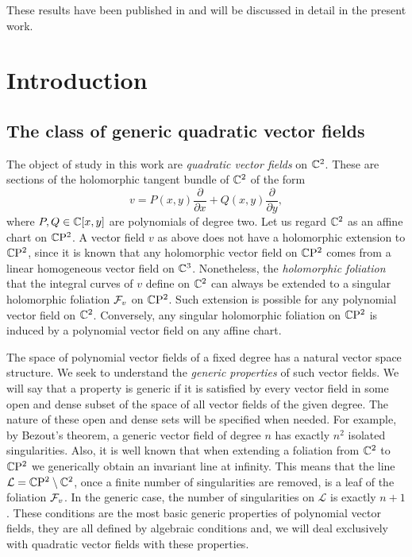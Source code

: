 \documentclass[phd,tocprelim]{cornell}
\begin{document}
These results have been published in \cite{TwinVectorFields,UtmostRigidity} and will be discussed in detail in the present work.


\pagestyle{cornell} \addtolength{\parskip}{0.5\baselineskip}





\chapter{Introduction}

\section{The class of generic quadratic vector fields}

The object of study in this work are \textit{quadratic vector fields} on $\mathbb{C}^2$. These are sections of the holomorphic tangent bundle of $\mathbb{C}^2$ of the form 
 \[ v = P(x,y)\frac{\partial}{\partial x} + Q(x,y)\frac{\partial}{\partial y}, \]
where $P,Q\in\mathbb{C}[x,y]$ are polynomials of degree two. Let us regard $\mathbb{C}^2$ as an affine chart on $\mathbb{C}\mathrm{P}^2$. A vector field $v$ as above does not have a holomorphic extension to $\mathbb{C}\mathrm{P}^2$, since it is known that any holomorphic vector field on $\mathbb{C}\mathrm{P}^2$ comes from a linear homogeneous vector field on $\mathbb{C}^3$. Nonetheless, the \textit{holomorphic foliation} that the integral curves of $v$ define on $\mathbb{C}^2$ can always be extended to a singular holomorphic foliation $\mathcal{F}_v$ on $\mathbb{C}\mathrm{P}^2$. Such extension is possible for any polynomial vector field on $\mathbb{C}^2$. Conversely, any singular holomorphic foliation on $\mathbb{C}\mathrm{P}^2$ is induced by a polynomial vector field on any affine chart.

The space of polynomial vector fields of a fixed degree has a natural vector space structure. We seek to understand the \textit{generic properties} of such vector fields. We will say that a property is generic if it is satisfied by every vector field in some open and dense subset of the space of all vector fields of the given degree. The nature of these open and dense sets will be specified when needed. For example, by Bezout's theorem, a generic vector field of degree $n$ has exactly $n^2$ isolated singularities. Also, it is well known that when extending a foliation from $\mathbb{C}^2$ to $\mathbb{C}\mathrm{P}^2$ we generically obtain an invariant line at infinity. This means that the line $\mathcal{L}=\mathbb{C}\mathrm{P}^2\setminus\mathbb{C}^2$, once a finite number of singularities are removed, is a leaf of the foliation $\mathcal{F}_v$. In the generic case, the number of singularities on $\mathcal{L}$ is exactly $n+1$. These conditions are the most basic generic properties of polynomial vector fields, they are all defined by algebraic conditions and, we will deal exclusively with quadratic vector fields with these properties. 
\end{document}
